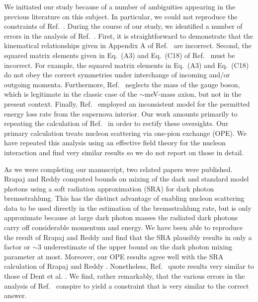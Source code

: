 \documentclass[nofootinbib,prd,superscriptaddress,twocolumn]{revtex4}
\begin{document}
We initiated our study because of a number of ambiguities appearing in the previous literature on this subject. 
In particular, we could not reproduce the constraints of Ref.~\cite{dent_etal12}. During the course of our 
study, we identified a number of errors in the analysis of Ref.~\cite{dent_etal12}. First, it is straightforward 
to demonstrate that the kinematical relationships given in Appendix A of Ref.~\cite{dent_etal12} are 
incorrect. Second, the squared matrix elements given in Eq.~(A3) and Eq.~(C18) of Ref.~\cite{dent_etal12} must 
be incorrect. 
For example, the squared 
matrix elements in Eq.~(A3) and Eq.~(C18) do not obey the correct symmetries under interchange of incoming 
and/or outgoing momenta. Furthermore, Ref.~\cite{dent_etal12} neglects the mass of the gauge boson, which 
is legitimate in the classic case of the $\sim$meV-mass axion, but not in the present context. Finally, Ref.~\cite{dent_etal12} 
employed an inconsistent model for the permitted energy loss rate from the supernova interior. Our work amounts 
primarily to repeating the calculation of Ref.~\cite{dent_etal12} in order to rectify these oversights. Our primary 
calculation treats nucleon scattering via one-pion exchange (OPE). We have repeated this analysis 
using an effective field theory for the nucleon interaction and find very similar results so we do not 
report on those in detail.


As we were completing our manuscript, two related papers were published. Rrapaj and Reddy \cite{rrapaj_reddy16} 
computed bounds on mixing of the dark and standard model photons using a soft radiation approximation (SRA) 
for dark photon bremsstrahlung. This has the distinct advantage of enabling nucleon scattering data to be used 
directly in the estimation of the bremsstrahlung rate, but is only approximate because at large dark photon masses 
the radiated dark photons carry off considerable momentum and energy. We have been able to reproduce the 
result of Rrapaj and Reddy \cite{rrapaj_reddy16} and find that the SRA plausibly results in only a factor or 
$\sim 3$ underestimate of the upper bound on the dark photon mixing parameter at most. Moreover, 
our OPE results agree well with the SRA calculation of Rrapaj and Reddy \cite{rrapaj_reddy16}. Nonetheless, 
Ref.~\cite{rrapaj_reddy16} quote results very similar to those of Dent et al. \cite{dent_etal12}. We find, 
rather remarkably, that the various errors in the analysis of Ref.~\cite{dent_etal12} conspire to yield a constraint that 
is very similar to the correct answer. 
\end{document}

